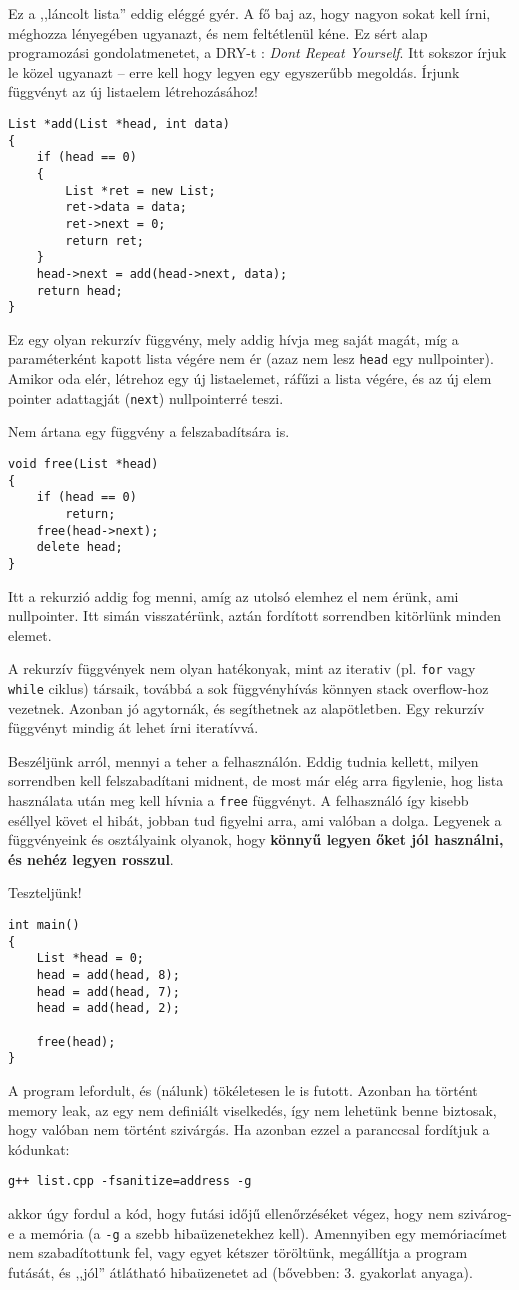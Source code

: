 \documentclass[a4paper,11.5pt]{article}
\begin{document}
	Ez a ,,láncolt lista'' eddig eléggé gyér. A fő baj az, hogy nagyon sokat kell írni, méghozza lényegében ugyanazt, és nem feltétlenül kéne. Ez sért alap programozási gondolatmenetet, a DRY-t : \textit{Dont Repeat Yourself}. Itt sokszor írjuk le közel ugyanazt -- erre kell hogy legyen egy egyszerűbb megoldás. Írjunk függvényt az új listaelem létrehozásához!
	\begin{lstlisting}
List *add(List *head, int data)
{
	if (head == 0)
	{
		List *ret = new List;
		ret->data = data;
		ret->next = 0;
		return ret;
	}
	head->next = add(head->next, data);
	return head;
}
	\end{lstlisting}
	Ez egy olyan rekurzív függvény, mely addig hívja meg saját magát, míg a paraméterként kapott lista végére nem ér (azaz nem lesz \texttt{head} egy nullpointer). Amikor oda elér, létrehoz egy új listaelemet, ráfűzi a lista végére, és az új elem pointer adattagját (\texttt{next}) nullpointerré teszi.
	\medskip
	
	Nem ártana egy függvény a felszabadítsára is.
	\begin{lstlisting}
void free(List *head)
{
	if (head == 0)
		return;
	free(head->next);
	delete head;
}
	\end{lstlisting}
	Itt a rekurzió addig fog menni, amíg az utolsó elemhez el nem érünk, ami nullpointer. Itt simán visszatérünk, aztán fordított sorrendben kitörlünk minden elemet.
	\begin{note}
		A rekurzív függvények nem olyan hatékonyak, mint az iterativ (pl. \texttt{for} vagy \texttt{while} ciklus) társaik, továbbá a sok függvényhívás könnyen stack overflow-hoz vezetnek. Azonban jó agytornák, és segíthetnek az alapötletben. Egy rekurzív függvényt mindig át lehet írni iteratívvá.
	\end{note}
	Beszéljünk arról, mennyi a teher a felhasználón. Eddig tudnia kellett, milyen sorrendben kell felszabadítani midnent, de most már elég arra figylenie, hog lista használata után meg kell hívnia a \texttt{free} függvényt. A felhasználó így kisebb eséllyel követ el hibát, jobban tud figyelni arra, ami valóban a dolga. Legyenek a függvényeink és osztályaink olyanok, hogy \textbf{könnyű legyen őket jól használni, és nehéz legyen rosszul}.
	
	\medskip
	Teszteljünk!
	\begin{lstlisting}
int main()
{
	List *head = 0;
	head = add(head, 8);
	head = add(head, 7);
	head = add(head, 2);
	
	free(head);
}
	\end{lstlisting}
	A program lefordult, és (nálunk) tökéletesen le is futott. Azonban ha történt memory leak, az egy nem definiált viselkedés, így nem lehetünk benne biztosak, hogy valóban nem történt szivárgás. Ha azonban ezzel a paranccsal fordítjuk a kódunkat:
	\begin{center}
		\texttt{g++ list.cpp -fsanitize=address -g}
	\end{center}
	akkor úgy fordul a kód, hogy futási időjű ellenőrzéséket végez, hogy nem szivárog-e a memória (a \texttt{-g} a szebb hibaüzenetekhez kell). Amennyiben egy memóriacímet nem szabadítottunk fel, vagy egyet kétszer töröltünk, megállítja a program futását, és ,,jól'' átlátható hibaüzenetet ad (bővebben: 3. gyakorlat anyaga). 
	
\end{document}
